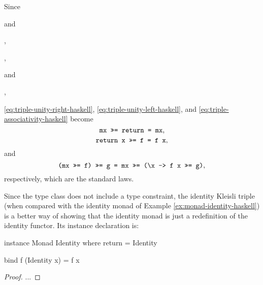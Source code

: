 Since
\begin{steps}
\end{steps}
and
\begin{steps}
  ,
\end{steps}
\begin{steps}
  ,
\end{steps}
and
\begin{steps}
    \eqbydef{\texthaskell{(>>=)} \eqref{eq:triple-to-alternative-bind-haskell}}
  ,
\end{steps}
\eqref{eq:triple-unity-right-haskell}, \eqref{eq:triple-unity-left-haskell},
and \eqref{eq:triple-associativity-haskell} become
\begin{equation}
  \text{\texttt{mx >>= return = mx}}
  \text{,}
\end{equation}
\begin{equation}
  \text{\texttt{return x >>= f = f x}}
  \text{,}
\end{equation}
and
\begin{equation}
  \text{\texttt{(mx >>= f) >>= g = mx >>= (\textbackslash x -> f x >>= g)}}
  \text{,}
\end{equation}
respectively, which are the standard laws.


\begin{example}
  \label{ex:triple-identity-haskell}

  Since the  type class does not include a
   type constraint, the identity Kleisli triple
  (when compared with the identity monad of Example
  \ref{ex:monad-identity-haskell}) is a better way of showing that the
  identity monad is just a redefinition of the identity functor. Its
  instance declaration is:
  \begin{codehaskell}
instance Monad Identity where
  return = Identity

  bind f (Identity x) = f x
  \end{codehaskell}

  \begin{proof}

    ...

  \end{proof}

\end{example}

